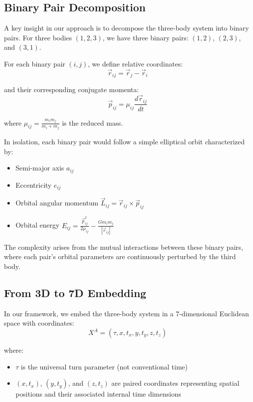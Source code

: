 \documentclass{article}
\begin{document}
\subsection{Binary Pair Decomposition}

A key insight in our approach is to decompose the three-body system into binary pairs. For three bodies $(1,2,3)$, we have three binary pairs: $(1,2)$, $(2,3)$, and $(3,1)$.

For each binary pair $(i,j)$, we define relative coordinates:
\begin{equation}
\vec{r}_{ij} = \vec{r}_j - \vec{r}_i
\end{equation}

and their corresponding conjugate momenta:
\begin{equation}
\vec{p}_{ij} = \mu_{ij} \frac{d\vec{r}_{ij}}{dt}
\end{equation}

where $\mu_{ij} = \frac{m_i m_j}{m_i + m_j}$ is the reduced mass.

In isolation, each binary pair would follow a simple elliptical orbit characterized by:
\begin{itemize}
\item Semi-major axis $a_{ij}$
\item Eccentricity $e_{ij}$
\item Orbital angular momentum $\vec{L}_{ij} = \vec{r}_{ij} \times \vec{p}_{ij}$
\item Orbital energy $E_{ij} = \frac{\vec{p}_{ij}^2}{2\mu_{ij}} - \frac{Gm_i m_j}{|\vec{r}_{ij}|}$
\end{itemize}

The complexity arises from the mutual interactions between these binary pairs, where each pair's orbital parameters are continuously perturbed by the third body.

\subsection{From 3D to 7D Embedding}

In our framework, we embed the three-body system in a 7-dimensional Euclidean space with coordinates:
\begin{equation}
X^A = (\tau, x, t_x, y, t_y, z, t_z)
\end{equation}

where:
\begin{itemize}
\item $\tau$ is the universal turn parameter (not conventional time)
\item $(x, t_x)$, $(y, t_y)$, and $(z, t_z)$ are paired coordinates representing spatial positions and their associated internal time dimensions
\end{itemize}
\end{document}
